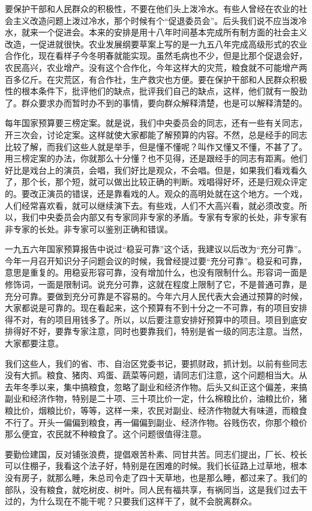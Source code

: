 要保护干部和人民群众的积极性，不要在他们头上泼冷水。有些人曾经在农业的社会主义改造问题上泼过冷水，那个时候有个“促退委员会”。后头我们说不应当泼冷水，就来一个促进会。本来的安排是用十八年时间基本完成所有制方面的社会主义改造，一促进就很快。农业发展纲要草案上写的是一九五八年完成高级形式的农业合作化，现在看样子今冬明春就能实现。虽然毛病也不少，但是比那个促退会好，农民高兴，农业增产。没有这个合作化，今年这样大的灾荒，粮食就不可能增产两百多亿斤。在灾荒区，有合作社，生产救灾也方便。要在保护干部和人民群众积极性的根本条件下，批评他们的缺点，批评我们自己的缺点，这样，他们就有一股劲了。群众要求办而暂时办不到的事情，要向群众解释清楚，也是可以解释清楚的。

每年国家预算要三榜定案。就是说，我们中央委员会的同志，还有一些有关同志，开三次会，讨论定案。这样就使大家都能了解预算的内容。不然，总是经手的同志比较了解，而我们这些人就是举手，但是懂不懂呢？叫作又懂又不懂，不甚了了。用三榜定案的办法，你就那么十分懂？也不见得，还是跟经手的同志有距离。他们好比是戏台上的演员，会唱，我们好比是观众，不会唱。但是，如果我们看戏看久了，那个长，那个短，就可以做出比较正确的判断。戏唱得好坏，还是归观众评定的。要改正演员的错误，还是靠看戏的人。观众的高明处就在这个地方。一个戏，人们经常喜欢看，就可以继续演下去。有些戏，人们不大高兴看，就必须改变。所以，我们中央委员会内部又有专家同非专家的矛盾。专家有专家的长处，非专家有非专家的长处。非专家可以鉴别正确和错误。

一九五六年国家预算报告中说过“稳妥可靠”这个话，我建议以后改为“充分可靠”。今年一月召开知识分子问题会议的时候，我曾经提过要“充分可靠”。稳妥和可靠，意思是重复的。用稳妥形容可靠，没有增加什么，也没有限制什么。形容词一面是修饰词，一面是限制词。说充分可靠，这就在程度上限制了它，不是普通可靠，是充分可靠。要做到充分可靠是不容易的。今年六月人民代表大会通过预算的时候，大家都说是可靠的。现在看起来，这个预算有不到十分之一不可靠，有的项目安排得不对，有的项目用钱多了。所以，以后要注意安排好预算中的项目。项目到底安排得好不好，要靠专家注意，同时也要靠我们，特别是省一级的同志注意。当然，大家都要注意。

我们这些人，我们的省、市、自治区党委书记，要抓财政，抓计划。以前有些同志没有大抓。粮食、猪肉、鸡蛋、蔬菜等问题，请同志们注意，这个问题相当大。从去年冬季以来，集中搞粮食，忽略了副业和经济作物。后头又纠正这个偏差，来搞副业和经济作物，特别是二十项、三十项比价一定，什么棉粮比价，油粮比价，猪粮比价，烟粮比价，等等，这样一来，农民对副业、经济作物就大有味道，而粮食不行了。开头一偏偏到粮食，再一偏偏到副业、经济作物。谷贱伤农，你那个粮价那么便宜，农民就不种粮食了。这个问题很值得注意。

要勤俭建国，反对铺张浪费，提倡艰苦朴素、同甘共苦。同志们提出，厂长、校长可以住棚子，我看这个法子好，特别是在困难的时候。我们长征路上过草地，根本没有房子，就那么睡，朱总司令走了四十天草地，也是那么睡，都过来了。我们的部队，没有粮食，就吃树皮、树叶。同人民有福共享，有祸同当，这是我们过去干过的，为什么现在不能干呢？只要我们这样干了，就不会脱离群众。

